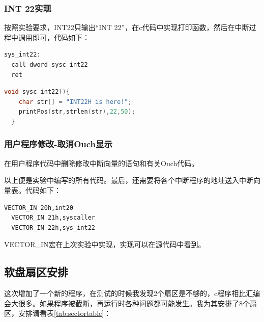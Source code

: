 \documentclass[a4paper, 11pt]{article} %
\begin{document}
\subsubsection{INT 22实现}
按照实验要求，INT22只输出“INT 22”，在c代码中实现打印函数，然后在中断过程中调用即可，代码如下：
\begin{lstlisting}[language={[x86masm]Assembler},label=sysint22,caption=22号中断的汇编过程]
sys_int22:
  call dword sysc_int22
  ret
\end{lstlisting}

\begin{lstlisting}[language={c},label=syscint22,caption=22号中断的c函数]
  void sysc_int22(){
    char str[] = "INT22H is here!";
    printPos(str,strlen(str),22,50);
  }
\end{lstlisting}
  
\subsubsection{用户程序修改-取消Ouch显示}
在用户程序代码中删除修改中断向量的语句和有关Ouch代码。

以上便是实验中编写的所有代码。最后，还需要将各个中断程序的地址送入中断向量表。代码如下：
\begin{lstlisting}[language={[x86masm]Assembler},label=IVT,caption=将中断程序地址写入中断向量表]
  VECTOR_IN 20h,int20
  VECTOR_IN 21h,syscaller
  VECTOR_IN 22h,sys_int22
\end{lstlisting}
VECTOR\_IN宏在上次实验中实现，实现可以在源代码中看到。

\subsection{软盘扇区安排}
这次增加了一个新的程序，在测试的时候我发现2个扇区是不够的，c程序相比汇编会大很多。如果程序被截断，再运行时各种问题都可能发生。我为其安排了8个扇区，安排请看表\ref{tab:sectortable}：
\end{document}
